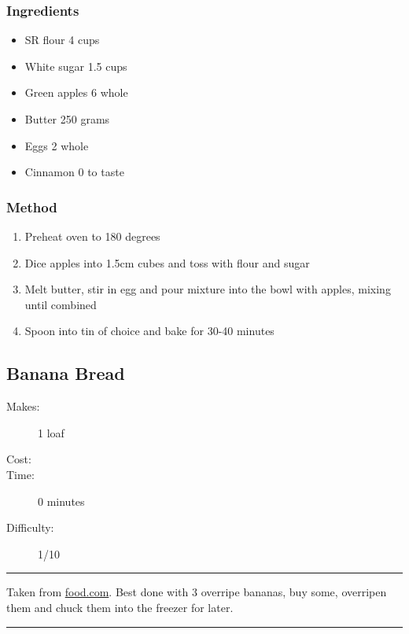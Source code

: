 \documentclass[]{article}
\begin{document}
\subsubsection*{\Large Ingredients}
\begin{multicols}{2}
\begin{itemize}
 \item SR flour \hfill 4 cups
 \item White sugar \hfill 1.5 cups
 \item Green apples \hfill 6 whole
 \item Butter \hfill 250 grams
 \item Eggs \hfill 2 whole
 \item Cinnamon \hfill 0 to taste
\end{itemize}
\end{multicols}
\subsubsection*{\Large Method}
\begin{enumerate}[font=\huge\color{accent}]
	\item Preheat oven to 180 degrees
	\item Dice apples into 1.5cm cubes and toss with flour and sugar
	\item Melt butter, stir in egg and pour mixture into the bowl with apples, mixing until combined
	\item Spoon into tin of choice and bake for 30-40 minutes
\end{enumerate}
\newpage
{}\label{rec:Banana Bread}
\subsection*{\center\huge Banana Bread}
\begin{description}
\item[Makes:] 1 loaf
\item[Cost:] \textdollar
\item[Time:] 0 minutes
\item[Difficulty:] 1/10
\end{description}
\vspace{0.2cm}\hrule\vspace{0.5cm}
\begin{adjustwidth}{0.5 cm}{0.5 cm}

Taken from \href{https://www.food.com/recipe/best-banana-bread-2886}{food.com}. Best done with 3 overripe bananas, buy some, overripen them and chuck them into the freezer for later. \hfill{}\color{black}

\end{adjustwidth}
\vspace{0.5cm}\hrule
\end{document}
